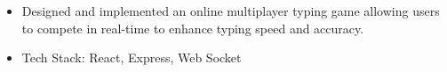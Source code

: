 \documentclass[]{resume}
\begin{document}
\begin{itemize}
  \item Designed and implemented an online multiplayer typing game allowing users to compete in real-time to enhance typing speed and accuracy.
  \item Tech Stack: React, Express, Web Socket
  
\end{itemize}
\end{document}
